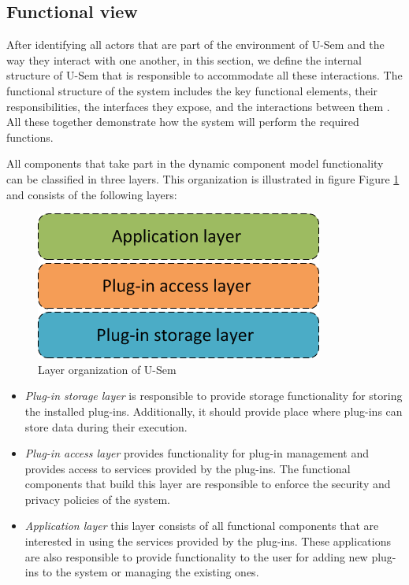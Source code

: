 \subsection{Functional view}

After identifying all actors that are part of the environment of U-Sem and the way they interact with one another, in this section, we define the internal structure of U-Sem that is responsible to accommodate all these interactions. The functional structure of the system includes the key functional elements, their responsibilities, the interfaces they expose, and the interactions between them \cite{Rozanski}. All these together demonstrate how the system will perform the required functions.

All components that take part in the dynamic component model functionality can be classified in three layers. This organization is illustrated in figure Figure \ref{fig_layer} and consists of the following layers:

\begin{figure}[h!]
  \centering
  	\includegraphics[scale=0.6]{plug-in/layers/layers.png}
  \caption{Layer organization of U-Sem}
  \label{fig_layer}
\end{figure}

\begin{itemize}
	\item \textit{Plug-in storage layer} is responsible to provide storage functionality for storing the installed plug-ins. Additionally, it should provide place where plug-ins can store data during their execution.
	\item \textit{Plug-in access layer} provides functionality for plug-in management and provides access to services provided by the plug-ins. The functional components that build this layer are responsible to enforce the security and privacy policies of the system.
	\item \textit{Application layer} this layer consists of all functional components that are interested in using the services provided by the plug-ins. These applications are also responsible to provide functionality to the user for adding new plug-ins to the system or managing the existing ones. 
	\end{itemize}

